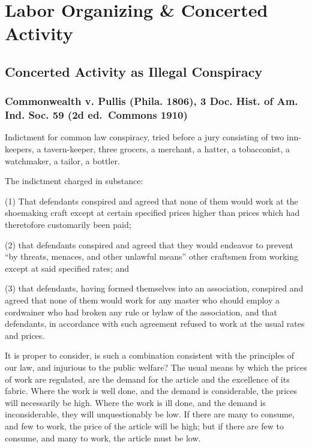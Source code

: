 \documentclass[
  letterpaper,
  11pt,
  DIV=9,
  openright]{scrbook}
\begin{document}
\chapter{Labor Organizing \& Concerted
Activity}\label{labor-organizing-concerted-activity}

\section{Concerted Activity as Illegal
Conspiracy}\label{concerted-activity-as-illegal-conspiracy}

\subsection{Commonwealth v. Pullis (Phila. 1806), 3 Doc. Hist. of Am.
Ind. Soc. 59 (2d ed.~Commons
1910)}\label{commonwealth-v.-pullis-phila.-1806-3-doc.-hist.-of-am.-ind.-soc.-59-2d-ed.-commons-1910}

Indictment for common law conspiracy, tried before a jury consisting of
two inn-keepers, a tavern-keeper, three grocers, a merchant, a hatter, a
tobacconist, a watchmaker, a tailor, a bottler.

The indictment charged in substance:

(1) That defendants conspired and agreed that none of them would work at
the shoemaking craft except at certain specified prices higher than
prices which had theretofore customarily been paid;

(2) that defendants conspired and agreed that they would endeavor to
prevent ``by threats, menaces, and other unlawful means'' other
craftsmen from working except at said specified rates; and


(3) that defendants, having formed themselves into an association,
conspired and agreed that none of them would work for any master who
should employ a cordwainer who had broken any rule or bylaw of the
association, and that defendants, in accordance with such agreement
refused to work at the usual rates and prices.

It is proper to consider, is such a combination consistent with the
principles of our law, and injurious to the public welfare? The usual
means by which the prices of work are regulated, are the demand for the
article and the excellence of its fabric. Where the work is well done,
and the demand is considerable, the prices will necessarily be high.
Where the work is ill done, and the demand is inconsiderable, they will
unquestionably be low. If there are many to consume, and few to work,
the price of the article will be high; but if there are few to consume,
and many to work, the article must be low.
\end{document}
